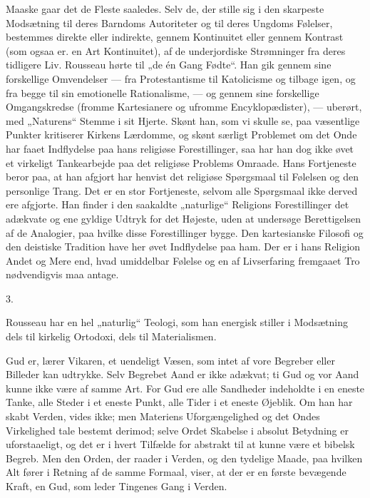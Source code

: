 \documentclass[12pt,a4paper,openany]{book}
\newcommand{\opage}[1]{\marginnote{\footnotesize\textit{[#1]}}}
\begin{document}
Maaske gaar det de Fleste saaledes. Selv de, der stille
sig i den skarpeste Modsætning til deres Barndoms Autoriteter
og til deres Ungdoms Følelser, bestemmes direkte eller indirekte,
gennem Kontinuitet eller gennem Kontrast (som ogsaa er.
en Art Kontinuitet), af de underjordiske Strømninger fra deres
tidligere Liv. Rousseau hørte til „de én Gang Fødte“. Han
gik gennem sine forskellige Omvendelser --- fra Protestantisme
til Katolicisme og tilbage igen, og fra begge til sin emotionelle
Rationalisme, --- og gennem sine forskellige Omgangskredse
(fromme Kartesianere og ufromme Encyklopædister), --- uberørt,
med „Naturens“ Stemme i sit Hjerte. Skønt han, som vi skulle
se, paa væsentlige Punkter kritiserer Kirkens Lærdomme, og
skønt særligt Problemet om det Onde har faaet Indflydelse paa
hans religiøse Forestillinger, saa har han dog ikke øvet et virkeligt
Tankearbejde paa det religiøse Problems Omraade. Hans
Fortjeneste beror paa, at han afgjort har henvist det religiøse
Spørgsmaal til Følelsen og den personlige Trang. Det er en
stor Fortjeneste, selvom alle Spørgsmaal ikke derved ere afgjorte.
Han finder i den saakaldte „naturlige“ Religions Forestillinger
det adækvate og ene gyldige Udtryk for det Højeste,
uden at undersøge Berettigelsen af de Analogier, paa hvilke
disse Forestillinger bygge. Den kartesianske Filosofi og den
deistiske Tradition have her øvet Indflydelse paa ham. Der er
i hans Religion Andet og Mere end, hvad umiddelbar Følelse
og en af Livserfaring fremgaaet Tro nødvendigvis maa antage.
\setcounter{footnote}{0}%
\opage{151}\begin{center}3.\end{center}

Rousseau har en hel „naturlig“ Teologi, som han energisk
stiller i Modsætning dels til kirkelig Ortodoxi, dels til Materialismen.


Gud er, lærer Vikaren, et uendeligt Væsen, som intet af
vore Begreber eller Billeder kan udtrykke. Selv Begrebet Aand
er ikke adækvat; ti Gud og vor Aand kunne ikke være af
samme Art. For Gud ere alle Sandheder indeholdte i en eneste
Tanke, alle Steder i et eneste Punkt, alle Tider i et eneste
Øjeblik. Om han har skabt Verden, vides ikke; men Materiens
Uforgængelighed og det Ondes Virkelighed tale bestemt derimod;
selve Ordet Skabelse i absolut Betydning er uforstaaeligt, og det
er i hvert Tilfælde for abstrakt til at kunne være et bibelsk
Begreb. Men den Orden, der raader i Verden, og den tydelige
Maade, paa hvilken Alt fører i Retning af de samme Formaal,
viser, at der er en første bevægende Kraft, en Gud, som
leder Tingenes Gang i Verden.
\end{document}
